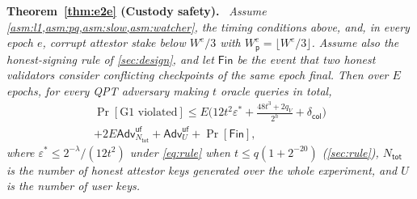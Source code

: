 \documentclass[10pt,journal,compsoc]{IEEEtran}
\theoremstyle{tplain}
\theoremstyle{tdef}
\theoremstyle{remark}
\newcommand{\Adv}{\mathsf{Adv}}
\newcommand{\Wp}{W_{\mathsf{p}}}
\newenvironment{restate}[1]{\par\smallskip\noindent\textbf{#1.}\ \itshape\ignorespaces}{\par\smallskip}
\begin{document}
\begin{restate}{Theorem~\ref{thm:e2e} (Custody safety)}
Assume \cref{asm:l1,asm:pq,asm:slow,asm:watcher}, the timing conditions above, and, in every epoch $e$, corrupt attestor stake below $W^e/3$ with $\Wp^e=\lfloor W^e/3\rfloor$. Assume also the honest-signing rule of \cref{sec:design}, and let $\mathsf{Fin}$ be the event that two honest validators consider conflicting checkpoints of the same epoch final. Then over $E$ epochs, for every QPT adversary making $t$ oracle queries in total,
\begin{multline*}
\Pr[\text{G1 violated}]\le E\Big(12t^2\varepsilon^\ast+\frac{48t^3+2q_V}{2^h}+\delta_{\mathsf{col}}\Big)\\+2E\Adv^{\mathsf{uf}}_{N_{\mathsf{tot}}}+\Adv^{\mathsf{uf}}_{U}+\Pr[\mathsf{Fin}],
\end{multline*}
where $\varepsilon^\ast\le 2^{-\lambda}/(12t^2)$ under \cref{eq:rule} when $t\le q(1+2^{-20})$ (\cref{sec:rule}), $N_{\mathsf{tot}}$ is the number of honest attestor keys generated over the whole experiment, and $U$ is the number of user keys.
\end{restate}
\end{document}
